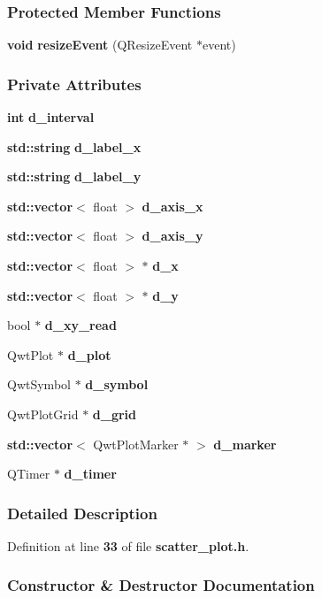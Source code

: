 \subsubsection*{Protected Member Functions}
\begin{DoxyCompactItemize}
\item 
{\bf void} {\bf resize\+Event} (Q\+Resize\+Event $\ast$event)
\end{DoxyCompactItemize}
\subsubsection*{Private Attributes}
\begin{DoxyCompactItemize}
\item 
{\bf int} {\bf d\+\_\+interval}
\item 
{\bf std\+::string} {\bf d\+\_\+label\+\_\+x}
\item 
{\bf std\+::string} {\bf d\+\_\+label\+\_\+y}
\item 
{\bf std\+::vector}$<$ float $>$ {\bf d\+\_\+axis\+\_\+x}
\item 
{\bf std\+::vector}$<$ float $>$ {\bf d\+\_\+axis\+\_\+y}
\item 
{\bf std\+::vector}$<$ float $>$ $\ast$ {\bf d\+\_\+x}
\item 
{\bf std\+::vector}$<$ float $>$ $\ast$ {\bf d\+\_\+y}
\item 
bool $\ast$ {\bf d\+\_\+xy\+\_\+read}
\item 
Qwt\+Plot $\ast$ {\bf d\+\_\+plot}
\item 
Qwt\+Symbol $\ast$ {\bf d\+\_\+symbol}
\item 
Qwt\+Plot\+Grid $\ast$ {\bf d\+\_\+grid}
\item 
{\bf std\+::vector}$<$ Qwt\+Plot\+Marker $\ast$ $>$ {\bf d\+\_\+marker}
\item 
Q\+Timer $\ast$ {\bf d\+\_\+timer}
\end{DoxyCompactItemize}


\subsubsection{Detailed Description}


Definition at line {\bf 33} of file {\bf scatter\+\_\+plot.\+h}.



\subsubsection{Constructor \& Destructor Documentation}
